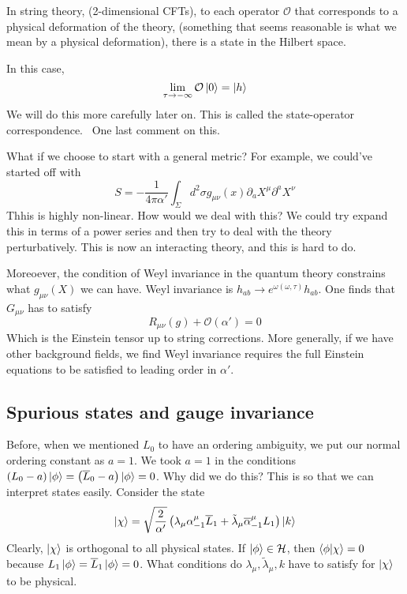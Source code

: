 \documentclass[11pt, oneside]{article}   	%
\theoremstyle{slanted}
\begin{document}
In string theory, (2-dimensional CFTs), 
to each operator $ \mathcal{ O } $ that 
corresponds to a physical deformation 
of the theory, (something that seems reasonable 
is what we mean by a physical deformation), 
there is a state in the Hilbert space. 

In this case, 
\[
 \lim_{ \tau \to  - \infty } \mathcal{ O } \ket{ 0 }  = \ket{ h } 
\] We will 
do this more carefully later on. 
This is called the state-operator correspondence. 
One last comment on this. 

What if we choose to start with a general metric?
For example, we could've started off with 
\[
 S  =  - \frac{1}{4 \pi \alpha '  } \int _{ \Sigma } d ^ 2 \sigma 
 g _{ \mu \nu } \left( x  \right)  \partial  _ a X^ \mu \partial  ^a X ^ \nu 
\]  Thhis is highly non-linear. 
How would we deal with this? 
We could try expand this in terms of a power series 
and then try to deal with the theory perturbatively.
This is now an interacting theory, 
and this is hard to do.

Moreoever, the condition of Weyl invariance 
in the quantum theory constrains what $ g _{ \mu \nu }\left( X  \right)   $ 
we can have. 
Weyl invariance is $ h _{ ab } \to e^{ \omega \left( \omega, \tau  \right)  } h _{ ab } $.
One finds that $ G _{ \mu \nu } $ has to satisfy 
\[
	R _{ \mu \nu } \left( g  \right)  + \mathcal{ O } \left( \alpha '   \right)   =0 
\] Which is the Einstein 
tensor up to string corrections. 
More generally, if we have other 
background fields, 
we find Weyl invariance requires 
the full Einstein equations to be satisfied to 
leading order in $ \alpha ' $.

\subsection{Spurious states and gauge invariance}
Before, when we mentioned $ L _ 0 $ to 
have an ordering ambiguity, 
we put our normal ordering constant  as $ a =1 $. 
We took $ a = 1  $ in the 
conditions $ \left( L_0  - a\right) \ket{ \phi }  = 
\left( \overline{ L } _ 0 - a  \right)  \ket{ \phi }  = 0  $. 
Why did we do this? 
This is so that we can interpret states easily. 
Consider the state 
\[
 \ket{ \chi }  = \sqrt{ \frac{2}{\alpha  ' } }  
 \left( \lambda _ \mu \alpha _{ - 1 } ^ \mu \overline{ L } _{  1 } + \tilde{\lambda }_ \mu 
 \overline{ \alpha } _{ - 1 } ^ \mu L _ 1  \right)  \ket{ k } 
\] Clearly, $ \ket{ \chi } $ is orthogonal 
to all physical states. 
If $ \ket{ \phi } \in \mathcal{ H } $, then $ \bra{ \phi }\ket{ \chi }  = 0  $
because $ L_1 \ket{ \phi }  = \overline{ L } _ 1 \ket{ \phi }   =0 $. 
What conditions do $ \lambda _ \mu , \tilde{\lambda }_ \mu  ,k   $ 
have to satisfy for $ \ket{ \chi }  $ to be physical. 
\end{document}
